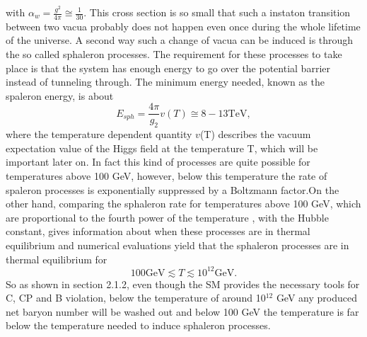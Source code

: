 with $\alpha_w=\frac{g^2}{4\pi}\cong\frac{1}{30}$.
This cross section is so small that such a instaton transition between two vacua probably does not happen even once during the whole lifetime of the universe. \newline\indent
A second way such a change of vacua can be induced is through the so called sphaleron processes. The requirement for these processes to take place is that the system has enough energy to go over the potential barrier instead of tunneling through. The minimum energy needed, known as the spaleron energy, is about\cite{Cline:2006ts,Bernreuther:2002uj}
\begin{equation}
	E_{sph}=\frac{4\pi}{g_2}v(T)\cong8-13\text{TeV},
	\label{eq:spaleron}
\end{equation} 
where the temperature dependent quantity $v$(T) describes the vacuum expectation value of the Higgs field at the temperature T, which will be important later on.\newline\indent
In fact this kind of processes are quite possible for temperatures above 100 GeV, however, below this temperature the rate of spaleron processes is exponentially suppressed by a Boltzmann factor.On the other hand, comparing the sphaleron rate for temperatures above 100 GeV, which are proportional to the fourth power of the temperature \cite[p. 19]{Bernreuther:2002uj}, with the Hubble constant, gives information about when these processes are in thermal equilibrium and numerical evaluations yield that the sphaleron processes are in thermal equilibrium for
\begin{equation*}
100\text{GeV}\lesssim T \lesssim 10^{12}\text{GeV}.
\end{equation*}
So as shown in section 2.1.2, even though the SM provides the necessary tools for C, CP and B violation, below the temperature of around 10$^{12}$ GeV any produced net baryon number will be washed out and below 100 GeV the temperature is far below the temperature needed to induce sphaleron processes. \newline\indent

